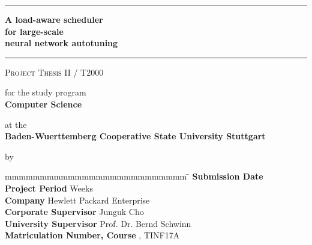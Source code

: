 \hfill
{}

\vfill
\begin{center}
	\rule{\textwidth}{1pt}
	{
		\Huge
		\bfseries
		A load-aware scheduler \\ for large-scale \\ neural network autotuning
		\par
	}
	\vspace{-0.2cm} 
	\rule{\textwidth}{1pt}

	\vfill

	\textsc{Project Thesis II / T2000}
	
	\vfill

	for the study program \\ \textbf{Computer Science}
	
	at the \\ \textbf{Baden-Wuerttemberg Cooperative State University Stuttgart}
	
	by \\ \textbf{\@author}
\end{center}

\vfill

\begin{tabbing}
	mmmmmmmmmmmmmmmmmmmmmmmmmm				\= \kill
	\textbf{Submission Date}				\> \@date \\
	\textbf{Project Period} 				 Weeks \\
	\textbf{Company}                        \> Hewlett Packard Enterprise \\
	\textbf{Corporate Supervisor}           \> Junguk Cho \\
	\textbf{University Supervisor}          \> Prof. Dr. Bernd Schwinn \\
	\textbf{Matriculation Number, Course}  	, TINF17A
\end{tabbing}

